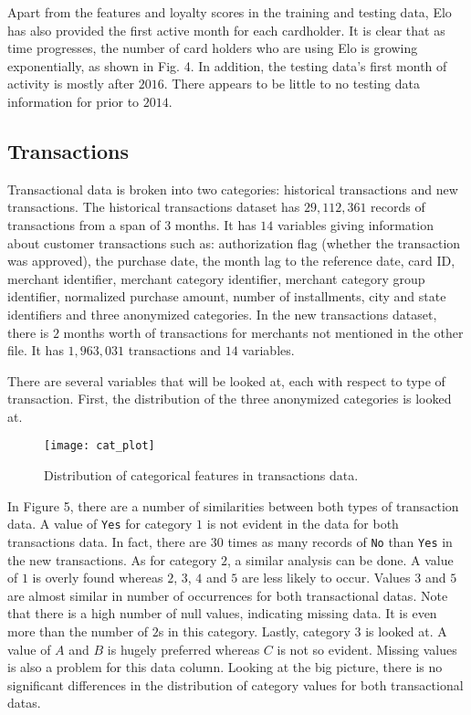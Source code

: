 \documentclass[journal, a4paper]{IEEEtran}
\begin{document}
Apart from the features and loyalty scores in the training and testing data, Elo has also provided the first active month for each cardholder. It is clear that as time progresses, the number of card holders who are using Elo is growing exponentially, as shown in Fig. 4. In addition, the testing data's first month of activity is mostly after $2016$. There appears to be little to no testing data information for prior to $2014$. 

\subsection{Transactions}
Transactional data is broken into two categories: historical transactions and new transactions. The historical transactions dataset has $29,112,361$ records of transactions from a span of $3$ months. It has $14$ variables giving information about customer transactions such as: authorization flag (whether the transaction was approved), the purchase date, the month lag to the reference date, card ID, merchant identifier, merchant category identifier, merchant category group identifier, normalized purchase amount, number of installments, city and state identifiers and three anonymized categories. In the new transactions dataset, there is $2$ months worth of transactions for merchants not mentioned in the other file. It has $1,963,031$ transactions and $14$ variables. 

There are several variables that will be looked at, each with respect to type of transaction. First, the distribution of the three anonymized categories is looked at. 
 \begin{figure}[t] \texttt{[image: cat\_plot]} \caption{Distribution of categorical features in transactions data.} \end{figure} 
In Figure 5, there are a number of similarities between both types of transaction data. A value of \texttt{Yes} for category $1$ is not evident in the data for both transactions data. In fact, there are $30$ times as many records of \texttt{No} than \texttt{Yes} in the new transactions. As for category $2$, a similar analysis can be done. A value of $1$ is overly found whereas $2$, $3$, $4$ and $5$ are less likely to occur. Values $3$ and $5$ are almost similar in number of occurrences for both transactional datas. Note that there is a high number of null values, indicating missing data. It is even more than the number of $2$s in this category. Lastly, category $3$ is looked at. A value of $A$ and $B$ is hugely preferred whereas $C$ is not so evident. Missing values is also a problem for this data column. Looking at the big picture, there is no significant differences in the distribution of category values for both transactional datas. 
\end{document}
